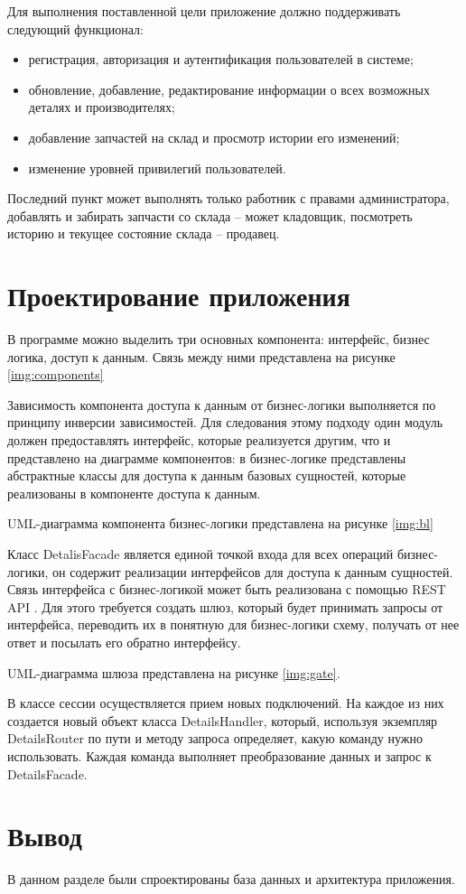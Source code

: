 Для выполнения поставленной цели приложение должно поддерживать следующий функционал: 
\begin{itemize}
	\item регистрация, авторизация и аутентификация пользователей в системе;
	\item обновление, добавление, редактирование информации о всех возможных деталях и производителях;
	\item добавление запчастей на склад и просмотр истории его изменений;
	\item изменение уровней привилегий пользователей.
\end{itemize}

Последний пункт может выполнять только работник с правами администратора, добавлять и забирать запчасти со склада -- может кладовщик, посмотреть историю и текущее состояние склада -- продавец.

\section{Проектирование приложения}

В программе можно выделить три основных компонента: интерфейс, бизнес логика, доступ к данным. Связь между ними представлена на рисунке \ref{img:components}


Зависимость компонента доступа к данным от бизнес-логики выполняется по принципу инверсии зависимостей. Для следования этому подходу один модуль должен предоставлять интерфейс, которые реализуется другим, что и представлено на диаграмме компонентов: в бизнес-логике представлены абстрактные классы для доступа к данным базовых сущностей, которые реализованы в компоненте доступа к данным.

UML-диаграмма компонента бизнес-логики представлена на рисунке \ref{img:bl}


Класс DetalisFacade является единой точкой входа для всех операций бизнес-логики, он содержит реализации интерфейсов для доступа к данным сущностей. Связь интерфейса с бизнес-логикой может быть реализована с помощью REST API \cite{rest-api}. Для этого требуется создать шлюз, который будет принимать запросы от интерфейса, переводить их в понятную для бизнес-логики схему, получать от нее ответ и посылать его обратно интерфейсу.

UML-диаграмма шлюза представлена на рисунке \ref{img:gate}.


В классе сессии осуществляется прием новых подключений. На каждое из них создается новый объект класса DetailsHandler, который, используя экземпляр DetailsRouter по пути и методу запроса определяет, какую команду нужно использовать. Каждая команда выполняет преобразование данных и запрос к DetailsFacade.

\section{Вывод}
В данном разделе были спроектированы база данных и архитектура приложения.